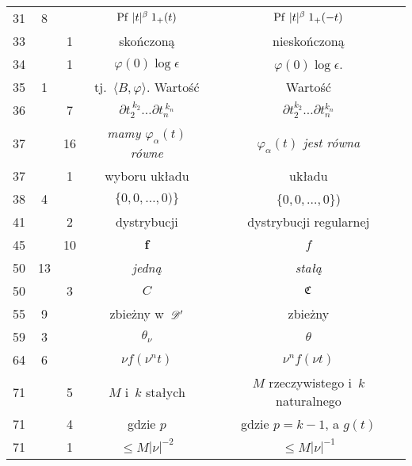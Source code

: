 \documentclass[a4paper,11pt]{article}
\begin{document}
\begin{center}
\begin{tabular}{|c|c|c|c|c|}
    31  &  8 & & $\mathrm{Pf}\, \, | t |^{ \beta } \; 1_{ + }( t )$
           & $\mathrm{Pf}\, \, | t |^{ \beta } \; 1_{ + }( -t )$ \\
    33  & &  1 & skończoną & nieskończoną \\
    34  & &  1 & $\varphi( 0 ) \log \epsilon$ & $\varphi( 0 ) \log \epsilon$. \\
    35 & 1 & & tj.~$\langle B, \varphi \rangle$. Wartość & Wartość \\
    36 & & 7 & $\partial t_{ 2 }^{ \: k_{ 2 } } \ldots \partial t_{ n }^{ \: k_{ n } }$
    & $\partial t_{ 2 }^{ k_{ 2 } } \ldots \partial t_{ n }^{ k_{ n } }$ \\
    37 & & 16 & \textit{mamy $\varphi_{ \alpha }( t )$ równe}
    & \textit{$\varphi_{ \alpha }( t )$ jest równa} \\
    37 & & 1 & wyboru układu & układu \\
    38  &  4 & & $\{ 0, 0, \ldots, 0 ) \}$ & $\{ 0, 0, \ldots, 0 \}$) \\
    41  & &  2 & dystrybucji & dystrybucji regularnej \\
    45  & & 10 & $\boldsymbol{f}$ & $f$ \\
    50  & 13 & & \textit{jedną} & \textit{stałą} \\
    50  & &  3 & $C$ & $\mathfrak{C}$ \\
    55  &  9 & & zbieżny w~$\mathcal{D}'$ & zbieżny \\
    59  &  3 & & $\theta_{ \nu }$ & $\theta$ \\
    64  &  6 & & $\nu f( \nu^{ n } t )$ & $\nu^{ n } f( \nu t )$ \\
    71 & & 5 & $M$ i~$k$ stałych & $M$ rzeczywistego i~$k$ naturalnego \\
    71 & & 4 & gdzie $p$ & gdzie $p = k - 1$, a $g( t )$ \\
    71 & & 1 & $\leq M | \nu |^{ -2 }$ & $\leq M | \nu |^{ -1 }$ \\
    \hline
  \end{tabular}

\end{center}
\end{document}
